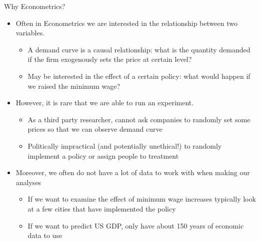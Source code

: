 \documentclass[notheorems,10pt]{beamer}
\begin{document}
\begin{frame}[t]{Why Econometrics?}
	\begin{minipage}[t][0.5\textheight]{\textwidth}
	\begin{itemize}
		\item<1-> Often in Econometrics we are interested in the  relationship between two variables.
		\begin{itemize}
			\item<2-3|only@2-3> A demand curve is a causal relationship: what is the quantity demanded if the firm exogenously sets the price at  certain level?
			\item<3|only@3> May be interested in the effect of a certain policy: what would happen if we raised the minimum wage?
		\end{itemize}
		\item<4-> However, it is rare that we are able to run an experiment. 
		\begin{itemize}
			\item<5-6|only@5-6> As a third party researcher, cannot ask companies to randomly set some prices so that we can observe demand curve
			\item<6|only@6> Politically impractical (and potentially unethical!) to randomly implement a policy or assign people to treatment
		\end{itemize}
		\item<7-> Moreover, we often do not have a lot of data to work with when making our analyses
		\begin{itemize}
			\item<8-9|only@8-9> If we want to examine the effect of minimum wage increases typically look at a few cities that have implemented the policy
			\item<9|only@9> If we want to predict US GDP, only have about 150 years of economic data to use
		\end{itemize}
	\end{itemize}
	\end{minipage}
	\vfill
	\begin{center}
	{}
	\end{center}
\end{frame}
\end{document}
